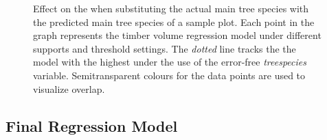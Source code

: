 \begin{figure}[h]
	\centering
	\caption{Effect on the \adjrsq{} when substituting the actual main tree species with the predicted  main tree species of a sample plot. Each point in the graph represents the timber volume regression model under different supports and threshold settings. The \textit{dotted} line tracks the the model with the highest \adjrsq{} under the use of the error-free \textit{treespecies} variable. Semitransparent colours for the data points are used to visualize overlap.}
	\label{fig:supp_r2_calnocal}
\end{figure}


\subsection{Final Regression Model}
\label{sec:regmod_final}

